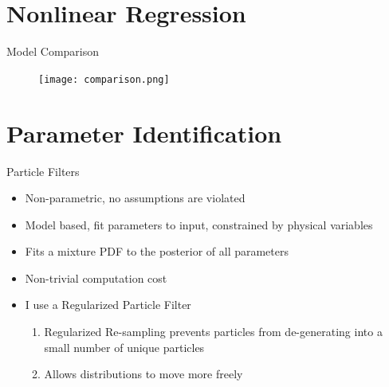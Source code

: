 \documentclass{beamer}
\begin{document}
\section{Nonlinear Regression}

\begin{frame}{Model Comparison}
  \begin{figure}
    \texttt{[image: comparison.png]}
    \caption{
        \tiny
        \cite{comparison}
    }
  \end{figure}
\end{frame}

\section{Parameter Identification}
\begin{frame}{Particle Filters}
\begin{itemize}
    \item Non-parametric, no assumptions are violated
    \item Model based, fit parameters to input, constrained by physical variables
    \item Fits a mixture PDF to the posterior of all parameters
    \item Non-trivial computation cost
    \item I use a Regularized Particle Filter
    \begin{enumerate}
        \item Regularized Re-sampling prevents particles from de-generating into a 
            small number of unique particles
        \item Allows distributions to move more freely
    \end{enumerate}
\end{itemize}
\end{frame}
\end{document}
